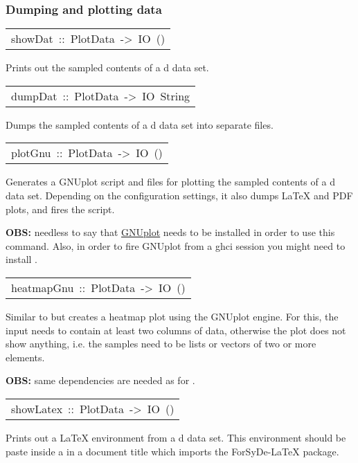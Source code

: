 \subsubsection{Dumping and plotting data}
\begin{haddockdesc}
\item[\begin{tabular}{@{}l}
showDat\ ::\ PlotData\ ->\ IO\ ()
\end{tabular}]\haddockbegindoc
Prints out the sampled contents of a d data set.\par


\item[\begin{tabular}{@{}l}
dumpDat\ ::\ PlotData\ ->\ IO\ {\char 91}String{\char 93}
\end{tabular}]\haddockbegindoc
Dumps the sampled contents of a d data set into separate
  files.\par


\item[\begin{tabular}{@{}l}
plotGnu\ ::\ PlotData\ ->\ IO\ ()
\end{tabular}]\haddockbegindoc
Generates a GNUplot script and  files for plotting the
 sampled contents of a d data set. Depending on the
 configuration settings, it also dumps LaTeX and PDF plots, and
 fires the script.\par
\textbf{OBS:} needless to say that \href{http://www.gnuplot.info/}{GNUplot}
 needs to be installed in order to use this command. Also, in order
 to fire GNUplot from a ghci session you might need to install
 .\par


\item[\begin{tabular}{@{}l}
heatmapGnu\ ::\ PlotData\ ->\ IO\ ()
\end{tabular}]\haddockbegindoc
Similar to  but creates a heatmap plot using the GNUplot
 engine. For this, the input needs to contain at least two columns
 of data, otherwise the plot does not show anything, i.e. the
 samples need to be lists or vectors of two or more elements.\par
\textbf{OBS:} same dependencies are needed as for .\par


\item[\begin{tabular}{@{}l}
showLatex\ ::\ PlotData\ ->\ IO\ ()
\end{tabular}]\haddockbegindoc
Prints out a LaTeX environment from a d data set. This
 environment should be paste inside a  in a document
 title which imports the ForSyDe-LaTeX package.\par



\end{haddockdesc}
